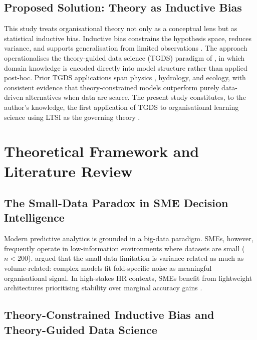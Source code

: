 \documentclass[11pt,a4paper]{article}
\begin{document}
\subsection{Proposed Solution: Theory as Inductive Bias}

This study treats organisational theory not only as a conceptual lens but as statistical inductive bias. Inductive bias constrains the hypothesis space, reduces variance, and supports generalisation from limited observations \citep{mitchell1980, abumostafa2012}. The approach operationalises the theory-guided data science (TGDS) paradigm of \citet{karpatne2017}, in which domain knowledge is encoded directly into model structure rather than applied post-hoc. Prior TGDS applications span physics \citep{raissi2019}, hydrology, and ecology, with consistent evidence that theory-constrained models outperform purely data-driven alternatives when data are scarce. The present study constitutes, to the author's knowledge, the first application of TGDS to organisational learning science using LTSI as the governing theory \citep{holton2000}.

\section{Theoretical Framework and Literature Review}

\subsection{The Small-Data Paradox in SME Decision Intelligence}

Modern predictive analytics is grounded in a big-data paradigm. SMEs, however, frequently operate in low-information environments where datasets are small ($n < 200$). \citet{aizenberh2024} argued that the small-data limitation is variance-related as much as volume-related: complex models fit fold-specific noise as meaningful organisational signal. In high-stakes HR contexts, SMEs benefit from lightweight architectures prioritising stability over marginal accuracy gains \citep{deloitte2026}.

\subsection{Theory-Constrained Inductive Bias and Theory-Guided Data Science}
\end{document}
